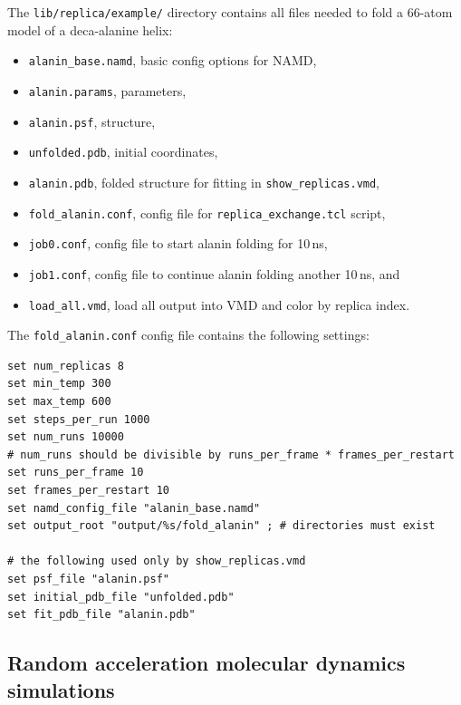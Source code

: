 The {\tt lib/replica/example/} directory contains
all files needed to fold a 66-atom model of a deca-alanine helix:
\begin{itemize}
\item {\tt alanin\_base.namd}, basic config options for NAMD,
\item {\tt alanin.params}, parameters,
\item {\tt alanin.psf}, structure,
\item {\tt unfolded.pdb}, initial coordinates,
\item {\tt alanin.pdb}, folded structure for fitting in {\tt show\_replicas.vmd},
\item {\tt fold\_alanin.conf}, config file for {\tt replica\_exchange.tcl} script,
\item {\tt job0.conf}, config file to start alanin folding for 10\,ns,
\item {\tt job1.conf}, config file to continue alanin folding another 10\,ns, and
\item {\tt load\_all.vmd}, load all output into VMD and color by replica index.
\end{itemize}

The {\tt fold\_alanin.conf} config file contains the following settings:
\begin{verbatim}
set num_replicas 8
set min_temp 300
set max_temp 600
set steps_per_run 1000
set num_runs 10000
# num_runs should be divisible by runs_per_frame * frames_per_restart
set runs_per_frame 10
set frames_per_restart 10
set namd_config_file "alanin_base.namd"
set output_root "output/%s/fold_alanin" ; # directories must exist

# the following used only by show_replicas.vmd
set psf_file "alanin.psf"
set initial_pdb_file "unfolded.pdb"
set fit_pdb_file "alanin.pdb"
\end{verbatim}

\subsection{Random acceleration molecular dynamics simulations}

